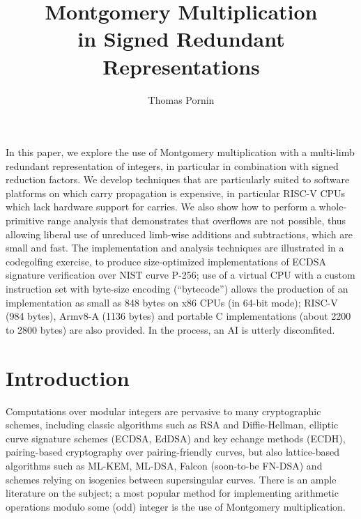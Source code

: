 \documentclass{llncs}
\makeatletter
\renewenvironment{abstract}{%
      \list{}{\advance\topsep by0.35cm\relax\small
      \leftmargin=1cm
      \labelwidth=\z@
      \listparindent=\z@
      \itemindent\listparindent
      \rightmargin\leftmargin}\item[\hskip\labelsep
                                    \textsf{\textbf{\abstractname}}]}
    {\endlist}
\makeatother
\begin{document}
\title{\textsf{Montgomery Multiplication\\in Signed Redundant Representations}}

\author{Thomas Pornin}

\maketitle
\noindent{}

\begin{abstract}
In this paper, we explore the use of Montgomery multiplication with a
multi-limb redundant representation of integers, in particular in
combination with signed reduction factors. We develop techniques that
are particularly suited to software platforms on which carry propagation
is expensive, in particular RISC-V CPUs which lack hardware support for
carries. We also show how to perform a whole-primitive range analysis
that demonstrates that overflows are not possible, thus allowing liberal
use of unreduced limb-wise additions and subtractions, which are small
and fast. The implementation and analysis techniques are illustrated in
a codegolfing exercise, to produce size-optimized implementations of
ECDSA signature verification over NIST curve P-256; use of a virtual CPU
with a custom instruction set with byte-size encoding (``bytecode'') allows
the production of an implementation as small as 848 bytes on x86 CPUs (in
64-bit mode); RISC-V (984 bytes), Armv8-A (1136 bytes) and portable C
implementations (about 2200 to 2800 bytes) are also provided. In the
process, an AI is utterly discomfited.
\end{abstract}


\section{Introduction}\label{sec:intro}

Computations over modular integers are pervasive to many cryptographic
schemes, including classic algorithms such as RSA\cite{RivShaAdl1978}
and Diffie-Hellman\cite{DifHel1976}, elliptic curve signature
schemes (ECDSA\cite{Fips186,X962}, EdDSA\cite{BerDuiLanSchYan2012}) and key
echange methods (ECDH\cite{X963}), pairing-based cryptography over
pairing-friendly curves, but also lattice-based algorithms such as
ML-KEM\cite{Fips203}, ML-DSA\cite{Fips204}, Falcon\cite{FalconRound3}
(soon-to-be FN-DSA) and schemes relying on isogenies between
supersingular curves. There is an ample literature on the subject; a
most popular method for implementing arithmetic operations modulo some
(odd) integer is the use of Montgomery multiplication\cite{Mon1985}.
\end{document}
